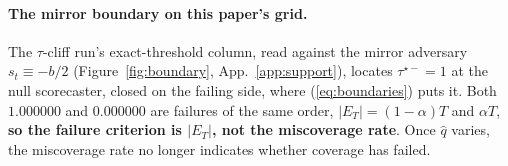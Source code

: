 \paragraph{The mirror boundary on this paper's grid.} The $\tau$-cliff
run's exact-threshold column, read against the mirror adversary $s_t
\equiv -b/2$ (Figure~\ref{fig:boundary}, App.~\ref{app:support}), locates $\tau^{\star-} = 1$ at
the null scorecaster, closed on the failing side,
where (\ref{eq:boundaries}) puts it.
Both $1.000000$ and $0.000000$ are failures of the same order, $|E_T| = (1-\alpha)T$ and
$\alpha T$, \textbf{so the failure criterion is $|E_T|$, not the miscoverage
rate}. Once $\hat{q}$ varies, the miscoverage rate no longer indicates whether coverage has failed.

